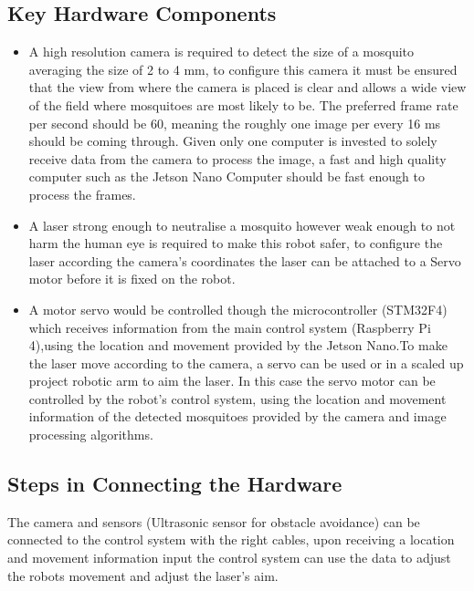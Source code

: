 \documentclass[11pt]{article}
\begin{document}
 \subsection{Key Hardware Components }
 \begin{itemize}
 	\item 	A high resolution camera is required to detect the size of a mosquito averaging the size of 2 to 4 mm, to configure this camera it must be ensured that the view from where the camera is placed is  clear and allows a wide view of the field where mosquitoes are most likely to be. The preferred frame rate per second should be 60, meaning the  roughly one image per every 16 ms should be coming through. Given only one computer is invested to solely receive data from the camera to process the image, a fast and high quality computer such as the Jetson Nano Computer should be fast enough to process the frames.
 	
 	\item A laser strong enough to neutralise a mosquito however weak enough to not harm the human eye is required to make this robot safer, to configure the laser according the camera's coordinates the laser can be attached to a Servo motor before it is fixed on the robot.
 	
 	\item A motor servo would be controlled though the microcontroller (STM32F4) which receives information from the main control system (Raspberry Pi 4),using the location and movement provided by the Jetson Nano.To make the laser move according to the camera, a servo can be used or in a scaled up project robotic arm to aim the laser. In this case the servo motor can be controlled by the robot's control system,  using the location and movement information of the detected mosquitoes provided by the camera and image processing algorithms.
 	
 	
 	
 	
 \end{itemize}
 
 	 	\subsection{Steps in Connecting the Hardware}
 	 	
 	 	The camera and sensors (Ultrasonic sensor for obstacle avoidance) can be connected to the control system with the  right cables, upon receiving a location and movement information input the control system can use the data to adjust the robots movement and adjust the laser's aim.
 	
\end{document}

